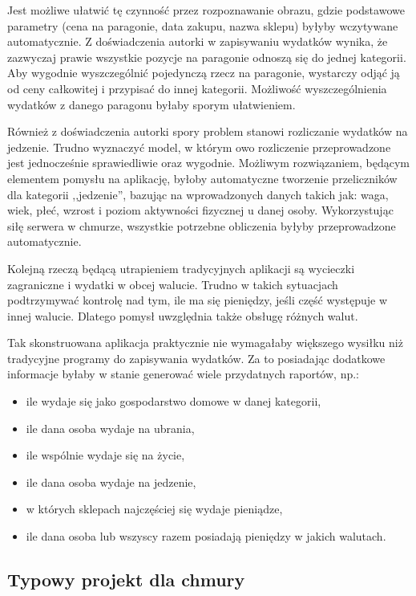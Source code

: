 \documentclass[12pt,a4paper,twoside,titlepage,openright]{book}
\begin{document}
Jest możliwe ułatwić tę czynność przez rozpoznawanie obrazu, gdzie podstawowe parametry (cena na paragonie, data zakupu, nazwa sklepu) byłyby wczytywane automatycznie. Z doświadczenia autorki w zapisywaniu wydatków wynika, że zazwyczaj prawie wszystkie pozycje na paragonie odnoszą się do jednej kategorii. Aby wygodnie wyszczególnić pojedynczą rzecz na paragonie, wystarczy odjąć ją od ceny całkowitej i przypisać do innej kategorii. Możliwość wyszczególnienia wydatków z danego paragonu byłaby sporym ułatwieniem.

Również z doświadczenia autorki spory problem stanowi rozliczanie wydatków na jedzenie. Trudno wyznaczyć model, w którym owo rozliczenie przeprowadzone jest jednocześnie sprawiedliwie oraz wygodnie. Możliwym rozwiązaniem, będącym elementem pomysłu na aplikację, byłoby automatyczne tworzenie przeliczników dla kategorii ,,jedzenie'', bazując na wprowadzonych danych takich jak: waga, wiek, płeć, wzrost i poziom aktywności fizycznej u danej osoby. Wykorzystując siłę serwera w chmurze, wszystkie potrzebne obliczenia byłyby przeprowadzone automatycznie.

Kolejną rzeczą będącą utrapieniem tradycyjnych aplikacji są wycieczki zagraniczne i wydatki w obcej walucie. Trudno w takich sytuacjach podtrzymywać kontrolę nad tym, ile ma się pieniędzy, jeśli część występuje w innej walucie. Dlatego pomysł uwzględnia także obsługę różnych walut.

Tak skonstruowana aplikacja praktycznie nie wymagałaby większego wysiłku niż tradycyjne programy do zapisywania wydatków. Za to posiadając dodatkowe informacje byłaby w stanie generować wiele przydatnych raportów, np.:
\begin{itemize}
\item ile wydaje się jako gospodarstwo domowe w danej kategorii,
\item ile dana osoba wydaje na ubrania,
\item ile wspólnie wydaje się na życie,
\item ile dana osoba wydaje na jedzenie,
\item w których sklepach najczęściej się wydaje pieniądze,
\item ile dana osoba lub wszyscy razem posiadają pieniędzy w jakich walutach.
\end{itemize}

\subsection{Typowy projekt dla chmury}
\end{document}
